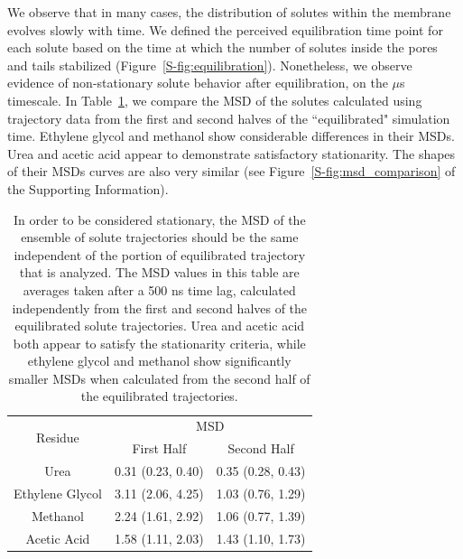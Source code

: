 \documentclass[12pt]{article}
\begin{document}
  We observe that in many cases, the distribution of solutes within the membrane
  evolves slowly with time. We defined the perceived equilibration time point 
  for each solute based on the time at which the number of solutes inside the
  pores and tails stabilized (Figure~\ref{S-fig:equilibration}). Nonetheless, we observe evidence of non-stationary
  solute behavior after equilibration, on the $\mu$s timescale. In Table~\ref{table:stationarity},
  we compare the MSD of the solutes calculated using trajectory data from the 
  first and second halves of the ``equilibrated" simulation time. Ethylene glycol 
  and methanol show considerable differences in their MSDs. Urea and acetic acid
  appear to demonstrate satisfactory stationarity. The shapes of their MSDs curves
  are also very similar (see Figure~\ref{S-fig:msd_comparison} of the Supporting
  Information).
  
  \begin{table}[h]
  \centering
  \begin{tabular}{|c|c|c|}
  \hline
  \multirow{2}{*}{Residue} & \multicolumn{2}{c|}{MSD}            \\\cline{2-3}
                           & First Half       & Second Half      \\\hline
  Urea                     & 0.31 (0.23, 0.40)& 0.35 (0.28, 0.43)\\\hline
  Ethylene Glycol          & 3.11 (2.06, 4.25)& 1.03 (0.76, 1.29)\\\hline
  Methanol                 & 2.24 (1.61, 2.92)& 1.06 (0.77, 1.39)\\\hline
  Acetic Acid              & 1.58 (1.11, 2.03)& 1.43 (1.10, 1.73)\\\hline

  \end{tabular}
  \caption{In order to be considered stationary, the MSD of the ensemble of solute trajectories
  should be the same independent of the portion of equilibrated trajectory that is
  analyzed. The MSD values in this table are averages taken after a 500 ns time lag, 
  calculated independently from the first and second halves of the equilibrated
  solute trajectories. Urea and acetic acid both appear to satisfy the stationarity
  criteria, while ethylene glycol and methanol show significantly smaller MSDs 
  when calculated from the second half of the equilibrated trajectories.}\label{table:stationarity}
  \end{table}
  
\end{document}
